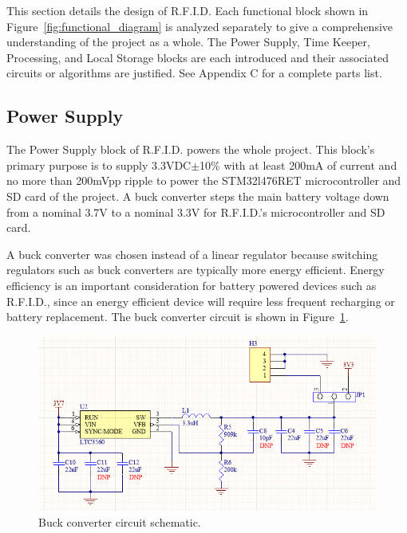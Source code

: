 This section details the design of R.F.I.D. Each functional block shown in Figure~\ref{fig:functional_diagram} is analyzed separately to give a comprehensive understanding of the project as a whole. The Power Supply, Time Keeper, Processing, and Local Storage blocks are each introduced and their associated circuits or algorithms are justified. See Appendix C for a complete parts list.

\subsection{Power Supply}

The Power Supply block of R.F.I.D. powers the whole project. This block's primary purpose is to supply 3.3VDC$\pm$10\% with at least 200mA of current and no more than 200mVpp ripple to power the STM32l476RET microcontroller and SD card of the project. A buck converter steps the main battery voltage down from a nominal 3.7V to a nominal 3.3V for R.F.I.D.'s microcontroller and SD card.


A buck converter was chosen instead of a linear regulator because switching regulators such as buck converters are typically more energy efficient. Energy efficiency is an important consideration for battery powered devices such as R.F.I.D., since an energy efficient device will require less frequent recharging or battery replacement. The buck converter circuit is shown in Figure~\ref{fig:buck_conv_schem}.

\begin{figure}[H]
    \centering
    \includegraphics[width=1\textwidth]{Figures/4_details/buck_schem.PNG} 
    \caption{Buck converter circuit schematic.}
    \label{fig:buck_conv_schem}
\end{figure}

